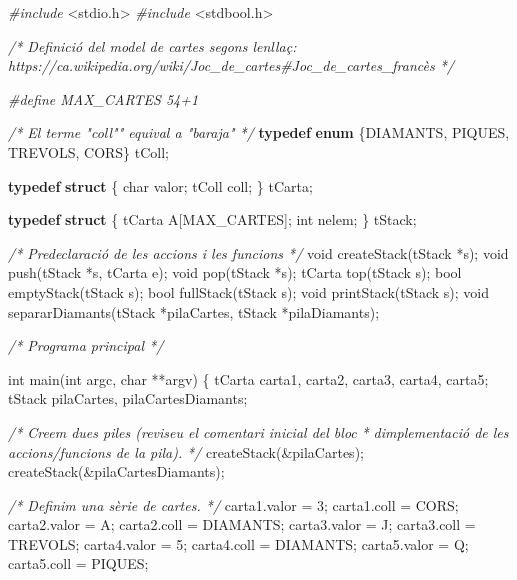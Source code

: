 \documentclass[
]{book}
\newenvironment{Shaded}{\begin{snugshade}}{\end{snugshade}}
\newcommand{\CharTok}[1]{\textcolor[rgb]{0.31,0.60,0.02}{#1}}
\newcommand{\CommentTok}[1]{\textcolor[rgb]{0.56,0.35,0.01}{\textit{#1}}}
\newcommand{\DataTypeTok}[1]{\textcolor[rgb]{0.13,0.29,0.53}{#1}}
\newcommand{\ImportTok}[1]{#1}
\newcommand{\KeywordTok}[1]{\textcolor[rgb]{0.13,0.29,0.53}{\textbf{#1}}}
\newcommand{\NormalTok}[1]{#1}
\newcommand{\PreprocessorTok}[1]{\textcolor[rgb]{0.56,0.35,0.01}{\textit{#1}}}
\begin{document}
\begin{Shaded}
\begin{Highlighting}[]
\PreprocessorTok{\#include }\ImportTok{\textless{}stdio.h\textgreater{}}
\PreprocessorTok{\#include }\ImportTok{\textless{}stdbool.h\textgreater{}}

\CommentTok{/* Definició del model de cartes segons l\textquotesingle{}enllaç:}
\CommentTok{   https://ca.wikipedia.org/wiki/Joc\_de\_cartes\#Joc\_de\_cartes\_francès */}

\PreprocessorTok{\#define MAX\_CARTES 54+1}

\CommentTok{/* El terme "coll"" equival a "baraja" */}
\KeywordTok{typedef} \KeywordTok{enum}\NormalTok{ \{DIAMANTS, PIQUES, TREVOLS, CORS\} tColl;}

\KeywordTok{typedef} \KeywordTok{struct}\NormalTok{ \{}
    \DataTypeTok{char}\NormalTok{ valor;}
\NormalTok{    tColl coll;}
\NormalTok{\} tCarta;}

\KeywordTok{typedef} \KeywordTok{struct}\NormalTok{ \{}
\NormalTok{    tCarta A[MAX\_CARTES];}
    \DataTypeTok{int}\NormalTok{ nelem;}
\NormalTok{\} tStack;}

\CommentTok{/* Predeclaració de les accions i les funcions */}
\DataTypeTok{void}\NormalTok{ createStack(tStack *s);}
\DataTypeTok{void}\NormalTok{ push(tStack *s, tCarta e);}
\DataTypeTok{void}\NormalTok{ pop(tStack *s);}
\NormalTok{tCarta top(tStack s);}
\DataTypeTok{bool}\NormalTok{ emptyStack(tStack s);}
\DataTypeTok{bool}\NormalTok{ fullStack(tStack s);}
\DataTypeTok{void}\NormalTok{ printStack(tStack s);}
\DataTypeTok{void}\NormalTok{ separarDiamants(tStack *pilaCartes, tStack *pilaDiamants);}

\CommentTok{/* Programa principal */}

\DataTypeTok{int}\NormalTok{ main(}\DataTypeTok{int}\NormalTok{ argc, }\DataTypeTok{char}\NormalTok{ **argv) \{}
\NormalTok{    tCarta carta1, carta2, carta3, carta4, carta5;}
\NormalTok{    tStack pilaCartes, pilaCartesDiamants;}
    
    \CommentTok{/* Creem dues piles (reviseu el comentari inicial del bloc}
\CommentTok{     * d\textquotesingle{}implementació de les accions/funcions de la pila). }
\CommentTok{     */}
\NormalTok{    createStack(\&pilaCartes);}
\NormalTok{    createStack(\&pilaCartesDiamants);}
    
    \CommentTok{/* Definim una sèrie de cartes. */}
\NormalTok{    carta1.valor = }\CharTok{\textquotesingle{}3\textquotesingle{}}\NormalTok{;}
\NormalTok{    carta1.coll = CORS;}
\NormalTok{    carta2.valor = }\CharTok{\textquotesingle{}A\textquotesingle{}}\NormalTok{;}
\NormalTok{    carta2.coll = DIAMANTS;}
\NormalTok{    carta3.valor = }\CharTok{\textquotesingle{}J\textquotesingle{}}\NormalTok{;}
\NormalTok{    carta3.coll = TREVOLS;}
\NormalTok{    carta4.valor = }\CharTok{\textquotesingle{}5\textquotesingle{}}\NormalTok{;}
\NormalTok{    carta4.coll = DIAMANTS;}
\NormalTok{    carta5.valor = }\CharTok{\textquotesingle{}Q\textquotesingle{}}\NormalTok{;}
\NormalTok{    carta5.coll = PIQUES;}
    

\end{Highlighting}
\end{Shaded}
\end{document}
